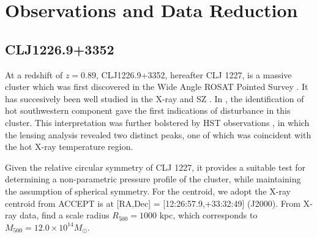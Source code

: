 \documentclass[twocolumn,traditabstract]{aa}
\begin{document}
\section{Observations and Data Reduction}
\label{sec:obs}

\subsection{CLJ1226.9+3352}
\label{sec:sample_clj1227}



At a redshift of $z=0.89$, CLJ1226.9+3352, hereafter CLJ 1227, is a massive cluster which was first discovered in the
Wide Angle ROSAT Pointed Survey \citep[WARPS][]{ebeling2001}. It has succesively been well studied
in the X-ray
\citep[\emph{XMM},\emph{Chandra}, and \emph{XMM/Chandra}][, respectively]{maughan2004,bonamente2006,maughan2007}
and SZ \citep[][]{joy2001,muchovej2007,mroczkowski2009,mroczkowski2011,bulbul2010,korngut2011,adam2015}.
In \citet{maughan2007}, the identification of hot southwestern component gave the first indications of disturbance
in this cluster. This interpretation was further bolstered by HST observations \citep{jee2009}, in which the lensing
analysis revealed two distinct peaks, one of which was coincident with the hot X-ray temperature region.

Given the relative circular symmetry of CLJ 1227, it provides a suitable test for determining a non-parametric pressure
profile of the cluster, while maintaining the assumption of spherical symmetry. For the centroid, we adopt the X-ray
centroid from ACCEPT \citep{cavagnolo2009} is at [RA,Dec] = [12:26:57.9,+33:32:49] (J2000).
From X-ray data, \citet{mantz2010} find a scale radius $R_{500} = 1000$ kpc, which corresponds to
$M_{500} = 12.0 \times 10^{14} M_{\odot}$.
\end{document}
